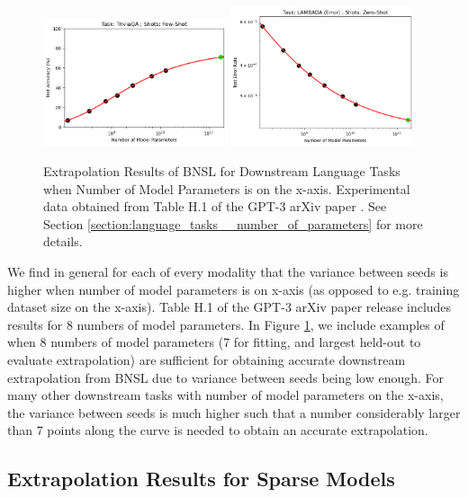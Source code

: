 \documentclass{article} %
\begin{document}
\begin{figure}[htbp]
\includegraphics[width=0.48\textwidth]{figures/gpt-3__parameter_scaling/TriviaQA___Few-Shot.png}
\includegraphics[width=0.48\textwidth]{figures/gpt-3__parameter_scaling/LAMBADA__Error____Zero-Shot.png}
    \caption{
Extrapolation Results of BNSL for Downstream Language Tasks when Number of Model Parameters is on the x-axis. Experimental data obtained from Table H.1 of the GPT-3 arXiv paper \citep{brown2020language}.
See Section \ref{section:language_tasks__number_of_parameters} for more details.
    }
    \label{fig:language_tasks__number_of_parameters}
\end{figure}

We find in general for each of every modality that the variance between seeds is higher when number of model parameters is on x-axis (as opposed to e.g. training dataset size on the x-axis). Table H.1 of the GPT-3 arXiv paper \citep{brown2020language} release includes results for 8 numbers of model parameters. In Figure \ref{fig:language_tasks__number_of_parameters}, we include examples of when 8 numbers of model parameters (7 for fitting, and largest held-out to evaluate extrapolation) are sufficient for obtaining accurate downstream extrapolation from BNSL due to variance between seeds being low enough. For many other downstream tasks with number of model parameters on the x-axis, the variance between seeds is much higher such that a number considerably larger than 7 points along the curve is needed to obtain an accurate extrapolation.

\clearpage

\subsection{Extrapolation Results for Sparse Models}
\label{section:sparse}
\end{document}
